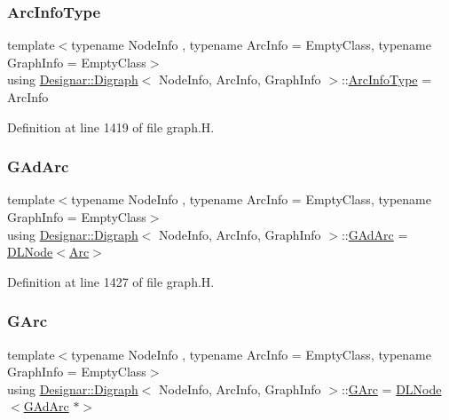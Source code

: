 \subsubsection{\texorpdfstring{Arc\+Info\+Type}{ArcInfoType}}
{\footnotesize\ttfamily template$<$typename Node\+Info , typename Arc\+Info  = Empty\+Class, typename Graph\+Info  = Empty\+Class$>$ \\
using \hyperlink{class_designar_1_1_digraph}{Designar\+::\+Digraph}$<$ Node\+Info, Arc\+Info, Graph\+Info $>$\+::\hyperlink{class_designar_1_1_digraph_a84a736f6c32da0fcbd1d047e74264d00}{Arc\+Info\+Type} =  Arc\+Info}



Definition at line 1419 of file graph.\+H.

\mbox{\label{class_designar_1_1_digraph_a0c6d846f23d1e82556fb6055557df53f}} 
\subsubsection{\texorpdfstring{G\+Ad\+Arc}{GAdArc}}
{\footnotesize\ttfamily template$<$typename Node\+Info , typename Arc\+Info  = Empty\+Class, typename Graph\+Info  = Empty\+Class$>$ \\
using \hyperlink{class_designar_1_1_digraph}{Designar\+::\+Digraph}$<$ Node\+Info, Arc\+Info, Graph\+Info $>$\+::\hyperlink{class_designar_1_1_digraph_a0c6d846f23d1e82556fb6055557df53f}{G\+Ad\+Arc} =  \hyperlink{class_designar_1_1_d_l_node}{D\+L\+Node}$<$\hyperlink{class_designar_1_1_digraph_a0ceb278671f2a535c00fddccdeafd69f}{Arc}$>$\hspace{0.3cm}{\ttfamily [protected]}}



Definition at line 1427 of file graph.\+H.

\mbox{\label{class_designar_1_1_digraph_a341acf8fb0195a8986158c29c4db1a89}} 
\subsubsection{\texorpdfstring{G\+Arc}{GArc}}
{\footnotesize\ttfamily template$<$typename Node\+Info , typename Arc\+Info  = Empty\+Class, typename Graph\+Info  = Empty\+Class$>$ \\
using \hyperlink{class_designar_1_1_digraph}{Designar\+::\+Digraph}$<$ Node\+Info, Arc\+Info, Graph\+Info $>$\+::\hyperlink{class_designar_1_1_digraph_a341acf8fb0195a8986158c29c4db1a89}{G\+Arc} =  \hyperlink{class_designar_1_1_d_l_node}{D\+L\+Node}$<$\hyperlink{class_designar_1_1_digraph_a0c6d846f23d1e82556fb6055557df53f}{G\+Ad\+Arc} $\ast$$>$\hspace{0.3cm}{\ttfamily [protected]}}



